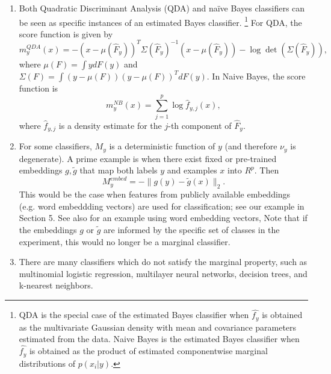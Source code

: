 \documentclass[twoside,11pt]{article}
\begin{document}
\begin{enumerate}

\item Both Quadratic Discriminant Analysis (QDA) and na\"{i}ve Bayes
  classifiers can be seen as specific instances of an estimated Bayes
  classifier.
\footnote{QDA is the special case of the estimated Bayes classifier
  when $\hat{f_y}$ is obtained as the multivariate Gaussian density
  with mean and covariance parameters estimated from the data.  Naive
  Bayes is the estimated Bayes classifier when $\hat{f_y}$ is obtained
  as the product of estimated componentwise marginal distributions of
  $p(x_i|y)$.}  For QDA, the score function is given by
\[
m_y^{QDA}(x) = -(x - \mu(\hat{F}_y))^T \Sigma(\hat{F}_y)^{-1} (x-\mu(\hat{F}_y)) - \log\det(\Sigma(\hat{F}_y)),
\]
where $\mu(F) = \int y dF(y)$ and $\Sigma(F) = \int (y-\mu(F))(y-\mu(F))^T dF(y)$.
In Naive Bayes, the score function is
\[
m^{NB}_y(x) = \sum_{j=1}^p \log \hat{f}_{y, j}(x),
\]
where $\hat{f}_{y, j}$ is a density estimate for the $j$-th component of
$\hat{F}_y$.
\item For some classifiers, $M_y$ is a deterministic function of $y$
  (and therefore $\nu_y$ is degenerate). A prime example is when
  there exist fixed or pre-trained embeddings $g, \tilde{g}$ that map both
  labels $y$ and examples $x$ into $R^p$. Then
\begin{equation}
M_y^{embed} = -\|g(y) - \tilde{g}(x)\|_2.
\end{equation}
This would be the case when features from publicly available embeddings (e.g. word embeddding vectors) are used for classification; see our example in Section 5.
See also \cite{pereira2018toward} for an example using word embedding vectors, 
Note that if the embeddings $g$ or $\tilde{g}$ are informed by the specific set of classes in the experiment, this would no longer be a marginal classifier. %

\item There are many classifiers which do not satisfy the marginal
  property, such as multinomial logistic regression, multilayer neural
  networks, decision trees, and k-nearest neighbors.
\end{enumerate}
\end{document}
